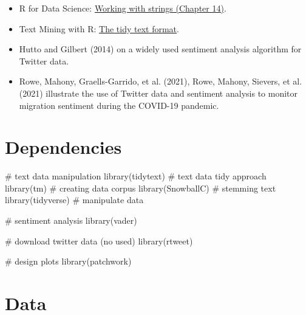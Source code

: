 \documentclass[
  letterpaper,
  DIV=11,
  numbers=noendperiod]{scrreprt}
\newenvironment{Shaded}{\begin{snugshade}}{\end{snugshade}}
\newcommand{\CommentTok}[1]{\textcolor[rgb]{0.37,0.37,0.37}{#1}}
\newcommand{\FunctionTok}[1]{\textcolor[rgb]{0.28,0.35,0.67}{#1}}
\newcommand{\NormalTok}[1]{\textcolor[rgb]{0.00,0.23,0.31}{#1}}
\begin{document}
\begin{itemize}
\item
  R for Data Science: \href{https://r4ds.had.co.nz/strings.html}{Working
  with strings (Chapter 14)}.
\item
  Text Mining with R:
  \href{https://www.tidytextmining.com/tidytext.html}{The tidy text
  format}.
\item
  Hutto and Gilbert (2014) on a widely used sentiment analysis algorithm
  for Twitter data.
\item
  Rowe, Mahony, Graells-Garrido, et al. (2021), Rowe, Mahony, Sievers,
  et al. (2021) illustrate the use of Twitter data and sentiment
  analysis to monitor migration sentiment during the COVID-19 pandemic.
\end{itemize}

\hypertarget{dependencies-1}{%
\section{Dependencies}\label{dependencies-1}}

\begin{Shaded}
\begin{Highlighting}[]
\CommentTok{\# text data manipulation}
\FunctionTok{library}\NormalTok{(tidytext) }\CommentTok{\# text data tidy approach}
\FunctionTok{library}\NormalTok{(tm) }\CommentTok{\# creating data corpus}
\FunctionTok{library}\NormalTok{(SnowballC) }\CommentTok{\# stemming text}
\FunctionTok{library}\NormalTok{(tidyverse) }\CommentTok{\# manipulate data}

\CommentTok{\# sentiment analysis}
\FunctionTok{library}\NormalTok{(vader)}

\CommentTok{\# download twitter data (no used)}
\FunctionTok{library}\NormalTok{(rtweet)}

\CommentTok{\# design plots}
\FunctionTok{library}\NormalTok{(patchwork)}
\end{Highlighting}
\end{Shaded}

\hypertarget{data-1}{%
\section{Data}\label{data-1}}
\end{document}

